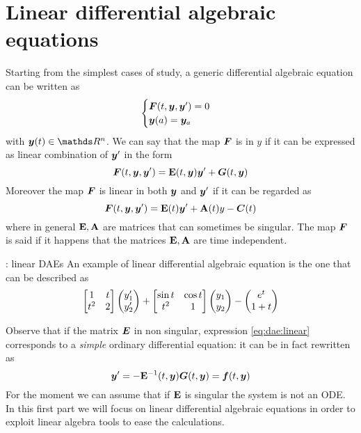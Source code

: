 \section{Linear differential algebraic equations}
	Starting from the simplest cases of study, a generic differential algebraic equation can be written as
	\[ \begin{cases}
		\boldsymbol{F}(t,\boldsymbol{y}, \boldsymbol{y}') = 0 \\ \boldsymbol{y}(a) = \boldsymbol{y}_a
	\end{cases} \]
	with $\vett y(t) \in \mathds R^n$. We can say that the map $\boldsymbol{F}$ is  in $y$ if it can be expressed as linear combination of $\boldsymbol{y}'$ in the form
	\begin{equation} \label{eq:dae:linear}
		\boldsymbol{F}(t,\boldsymbol{y}, \boldsymbol{y}') = \mathbf{E}(t,\boldsymbol{y}) \boldsymbol{y}' + \boldsymbol{G}(t,\boldsymbol{y})
	\end{equation}
	Moreover the map $\boldsymbol{F}$ is linear in both $\boldsymbol{y}$ and $\boldsymbol{y}'$ if it can be regarded as
	\begin{equation} \label{eq:dae:linear2}
		\boldsymbol{F}(t,\boldsymbol{y}, \boldsymbol{y}') = \mathbf{E}(t) \boldsymbol{y}' + \mathbf{A}(t) y  - \boldsymbol{C}(t)
	\end{equation}
	where in general $\mathbf{E},\mathbf{A}$ are matrices that can sometimes be singular. The map $\boldsymbol{F}$ is said  if it happens that the matrices $\mathbf{E},\mathbf{A}$ are time independent.
	
	\begin{example}{: linear DAEs}
		An example of linear differential algebraic equation is the one that can be described as
		\[ \begin{bmatrix} 1 & t \\ t^2 & 2 \end{bmatrix} \begin{pmatrix}  y_1' \\ y_2' \end{pmatrix} + \begin{bmatrix} \sin t & \cos t \\ t^2 & 1 \end{bmatrix} \begin{pmatrix} y_1 \\ y_2 \end{pmatrix} - \begin{pmatrix} e^t \\ 1+t \end{pmatrix} \]
	\end{example}
	
	Observe that if the matrix $\boldsymbol{E}$ in non singular, expression \ref{eq:dae:linear} corresponds to a \textit{simple} ordinary differential equation: it can be in fact rewritten as
	\begin{equation}
		\boldsymbol{y}' = - \mathbf{E}^{-1}(t,\boldsymbol{y}) \boldsymbol{G}(t,\boldsymbol{y}) = \boldsymbol{f}(t,\boldsymbol{y})
	\end{equation}
	For the moment we can assume that if $\mathbf{E}$ is singular the system is not an ODE. In this first part we will focus on linear differential algebraic equations in order to exploit linear algebra tools to ease the calculations.
	
